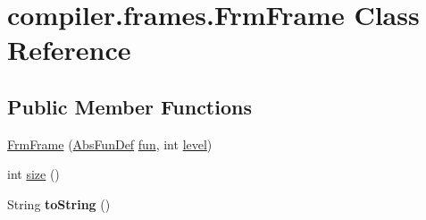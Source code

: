 \hypertarget{classcompiler_1_1frames_1_1_frm_frame}{}\section{compiler.\+frames.\+Frm\+Frame Class Reference}
\label{classcompiler_1_1frames_1_1_frm_frame}
\subsection*{Public Member Functions}
\begin{DoxyCompactItemize}
\item 
\hyperlink{classcompiler_1_1frames_1_1_frm_frame_acf9124e5c5408bc0f4a80bc61e492273}{Frm\+Frame} (\hyperlink{classcompiler_1_1abstr_1_1tree_1_1def_1_1_abs_fun_def}{Abs\+Fun\+Def} \hyperlink{classcompiler_1_1frames_1_1_frm_frame_a800e5923693318d36b54a28dd64d7cf7}{fun}, int \hyperlink{classcompiler_1_1frames_1_1_frm_frame_a5cf4f72e35b816f6f162a8495e288d00}{level})
\item 
int \hyperlink{classcompiler_1_1frames_1_1_frm_frame_adefc5d8bee9e566c0a632fc3adbf860a}{size} ()
\item 
\mbox{\label{classcompiler_1_1frames_1_1_frm_frame_a2392e2015d9ddb31d3983cc129d8f462}} 
String {\bfseries to\+String} ()
\end{DoxyCompactItemize}
